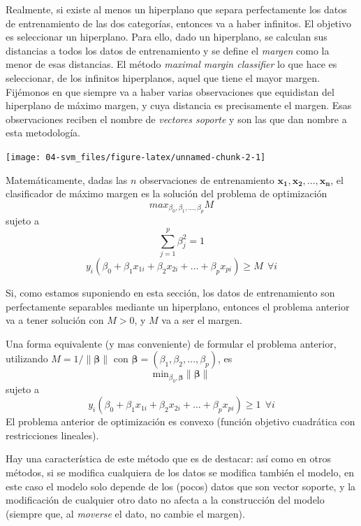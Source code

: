 \documentclass[
]{book}
\theoremstyle{break}
\theoremstyle{definition}
\theoremstyle{definition}
\theoremstyle{definition}
\theoremstyle{definition}
\theoremstyle{remark}
\begin{document}
Realmente, si existe al menos un hiperplano que separa perfectamente los datos de entrenamiento de las dos categorías, entonces va a haber infinitos. El objetivo es seleccionar un hiperplano. Para ello, dado un hiperplano, se calculan sus distancias a todos los datos de entrenamiento y se define el \emph{margen} como la menor de esas distancias. El método \emph{maximal margin classifier} lo que hace es seleccionar, de los infinitos hiperplanos, aquel que tiene el mayor margen. Fijémonos en que siempre va a haber varias observaciones que equidistan del hiperplano de máximo margen, y cuya distancia es precisamente el margen. Esas observaciones reciben el nombre de \emph{vectores soporte} y son las que dan nombre a esta metodología.

\begin{center}\texttt{[image: 04-svm\_files/figure-latex/unnamed-chunk-2-1]} \end{center}

Matemáticamente, dadas las \(n\) observaciones de entrenamiento \(\mathbf{x_1}, \mathbf{x_2}, \ldots, \mathbf{x_n}\), el clasificador de máximo margen es la solución del problema de optimización
\[max_{\beta_0, \beta_1,\ldots, \beta_p} M\]
sujeto a
\[\sum_{j=1}^p \beta_j^2 = 1\]
\[ y_i(\beta_0 + \beta_1 x_{1i} + \beta_2 x_{2i} + \ldots + \beta_p x_{pi}) \ge M \ \ \forall i\]

Si, como estamos suponiendo en esta sección, los datos de entrenamiento son perfectamente separables mediante un hiperplano, entonces el problema anterior va a tener solución con \(M>0\), y \(M\) va a ser el margen.

Una forma equivalente (y mas conveniente) de formular el problema anterior, utilizando \(M = 1/\lVert \boldsymbol{\beta} \rVert\) con \(\boldsymbol{\beta} = (\beta_1, \beta_2, \ldots, \beta_p)\), es
\[\mbox{min}_{\beta_0, \boldsymbol{\beta}} \lVert \boldsymbol{\beta} \rVert\]
sujeto a
\[ y_i(\beta_0 + \beta_1 x_{1i} + \beta_2 x_{2i} + \ldots + \beta_p x_{pi}) \ge 1 \ \ \forall i\]
El problema anterior de optimización es convexo (función objetivo cuadrática con restricciones lineales).

Hay una característica de este método que es de destacar: así como en otros métodos, si se modifica cualquiera de los datos se modifica también el modelo, en este caso el modelo solo depende de los (pocos) datos que son vector soporte, y la modificación de cualquier otro dato no afecta a la construcción del modelo (siempre que, al \emph{moverse} el dato, no cambie el margen).
\end{document}
